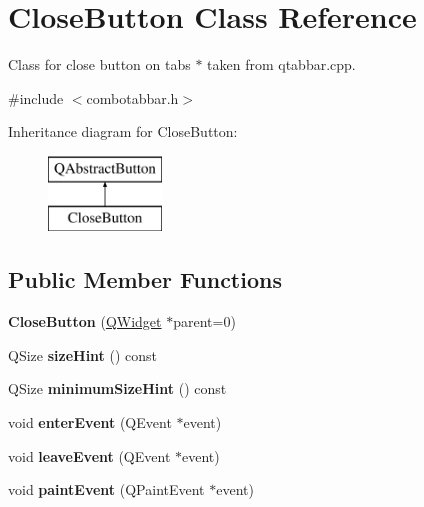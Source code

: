 \hypertarget{class_close_button}{
\section{CloseButton Class Reference}
\label{class_close_button}
}


Class for close button on tabs $\ast$ taken from qtabbar.cpp.  




{\ttfamily \#include $<$combotabbar.h$>$}

Inheritance diagram for CloseButton:\begin{figure}[H]
\begin{center}
\leavevmode
\includegraphics[height=2cm]{class_close_button}
\end{center}
\end{figure}
\subsection*{Public Member Functions}
\begin{DoxyCompactItemize}
\item 
\hypertarget{class_close_button_a51839d4283758bd7221bafe64d08073b}{
{\bfseries CloseButton} (\hyperlink{class_q_widget}{QWidget} $\ast$parent=0)}
\label{class_close_button_a51839d4283758bd7221bafe64d08073b}

\item 
\hypertarget{class_close_button_a468e5cea5ea5f11477651a3c66f38f67}{
QSize {\bfseries sizeHint} () const }
\label{class_close_button_a468e5cea5ea5f11477651a3c66f38f67}

\item 
\hypertarget{class_close_button_a481ecf1d325b880fbedd34c02d2ad566}{
QSize {\bfseries minimumSizeHint} () const }
\label{class_close_button_a481ecf1d325b880fbedd34c02d2ad566}

\item 
\hypertarget{class_close_button_acf50f097face931a52329e1e5e8aeddd}{
void {\bfseries enterEvent} (QEvent $\ast$event)}
\label{class_close_button_acf50f097face931a52329e1e5e8aeddd}

\item 
\hypertarget{class_close_button_abdbde1a235729d0f245ede0d8056c809}{
void {\bfseries leaveEvent} (QEvent $\ast$event)}
\label{class_close_button_abdbde1a235729d0f245ede0d8056c809}

\item 
\hypertarget{class_close_button_ae0531ab78ea9542c1a261ab4d0d8125b}{
void {\bfseries paintEvent} (QPaintEvent $\ast$event)}
\label{class_close_button_ae0531ab78ea9542c1a261ab4d0d8125b}

\end{DoxyCompactItemize}


